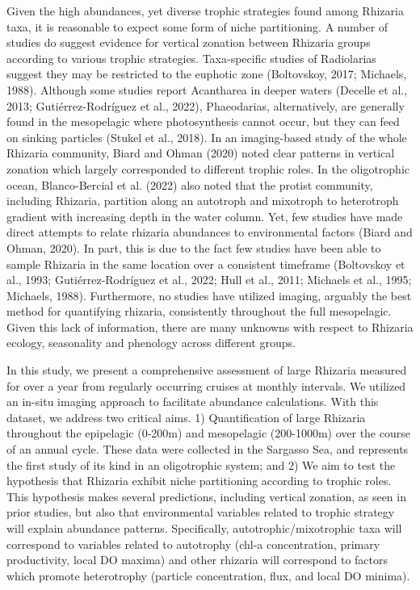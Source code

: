 \documentclass[
]{article}
\begin{document}
Given the high abundances, yet diverse trophic strategies found among
Rhizaria taxa, it is reasonable to expect some form of niche
partitioning. A number of studies do suggest evidence for vertical
zonation between Rhizaria groups according to various trophic
strategies. Taxa-specific studies of Radiolarias suggest they may be
restricted to the euphotic zone (Boltovskoy, 2017; Michaels, 1988).
Although some studies report Acantharea in deeper waters (Decelle et
al., 2013; Gutiérrez-Rodríguez et al., 2022), Phaeodarias,
alternatively, are generally found in the mesopelagic where
photosynthesis cannot occur, but they can feed on sinking particles
(Stukel et al., 2018). In an imaging-based study of the whole Rhizaria
community, Biard and Ohman (2020) noted clear patterns in vertical
zonation which largely corresponded to different trophic roles. In the
oligotrophic ocean, Blanco-Bercial et al. (2022) also noted that the
protist community, including Rhizaria, partition along an autotroph and
mixotroph to heterotroph gradient with increasing depth in the water
column. Yet, few studies have made direct attempts to relate rhizaria
abundances to environmental factors (Biard and Ohman, 2020). In part,
this is due to the fact few studies have been able to sample Rhizaria in
the same location over a consistent timeframe (Boltovskoy et al., 1993;
Gutiérrez-Rodríguez et al., 2022; Hull et al., 2011; Michaels et al.,
1995; Michaels, 1988). Furthermore, no studies have utilized imaging,
arguably the best method for quantifying rhizaria, consistently
throughout the full mesopelagic. Given this lack of information, there
are many unknowns with respect to Rhizaria ecology, seasonality and
phenology across different groups.

In this study, we present a comprehensive assessment of large Rhizaria
measured for over a year from regularly occurring cruises at monthly
intervals. We utilized an in-situ imaging approach to facilitate
abundance calculations. With this dataset, we address two critical aims.
1) Quantification of large Rhizaria throughout the epipelagic (0-200m)
and mesopelagic (200-1000m) over the course of an annual cycle. These
data were collected in the Sargasso Sea, and represents the first study
of its kind in an oligotrophic system; and 2) We aim to test the
hypothesis that Rhizaria exhibit niche partitioning according to trophic
roles. This hypothesis makes several predictions, including vertical
zonation, as seen in prior studies, but also that environmental
variables related to trophic strategy will explain abundance patterns.
Specifically, autotrophic/mixotrophic taxa will correspond to variables
related to autotrophy (chl-a concentration, primary productivity, local
DO maxima) and other rhizaria will correspond to factors which promote
heterotrophy (particle concentration, flux, and local DO minima).
\end{document}
